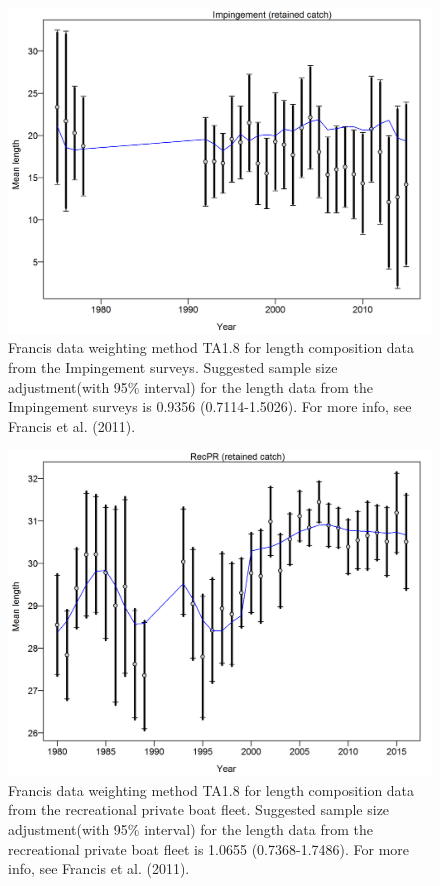 \documentclass[12pt,]{article}
\begin{document}
\begin{figure}[htbp]
\centering
\includegraphics{r4ss/plots_mod1/comp_lendat_data_weighting_TA1.8_Impingement.png}
\caption{Francis data weighting method TA1.8 for length composition data
from the Impingement surveys. Suggested sample size adjustment(with 95\%
interval) for the length data from the Impingement surveys is 0.9356
(0.7114-1.5026). For more info, see Francis et al. (2011).
\label{fig:comp_lendat_data_weighting_TA1.8_Impingement}}
\end{figure}

\begin{figure}[htbp]
\centering
\includegraphics{r4ss/plots_mod1/comp_lendat_data_weighting_TA1.8_RecPR.png}
\caption{Francis data weighting method TA1.8 for length composition data
from the recreational private boat fleet. Suggested sample size
adjustment(with 95\% interval) for the length data from the recreational
private boat fleet is 1.0655 (0.7368-1.7486). For more info, see Francis
et al. (2011). \label{fig:comp_lendat_data_weighting_TA1.8_RecPR}}
\end{figure}
\end{document}
